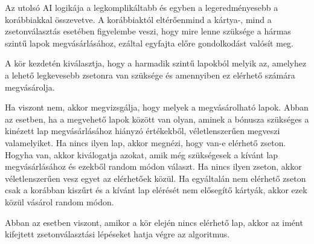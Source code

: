 Az utolsó AI logikája a legkomplikáltabb és egyben a legeredményesebb a korábbiakkal összevetve. A korábbiaktól eltérőenmind a kártya-, mind a zsetonválasztás esetében figyelembe veszi, hogy mire lenne szüksége a hármas szintű lapok megvásárlásához, ezáltal egyfajta előre gondolkodást valósít meg.\par
A kör kezdetén kiválasztja, hogy a harmadik szintű lapokból melyik az, amelyhez a lehető legkevesebb zsetonra van szüksége és amennyiben ez elérhető számára megvásárolja.\par
Ha viszont nem, akkor megvizsgálja, hogy melyek a megvásárolható lapok. Abban az esetben, ha a megvehető lapok között van olyan, aminek a bónusza szükséges a kinézett lap megvásárlásához hiányzó értékekből, véletlenszerűen megveszi valamelyiket. Ha nincs ilyen lap, akkor megnézi, hogy van-e elérhető zseton. Hogyha van, akkor kiválogatja azokat, amik még szükségesek a kívánt lap megvásárlásához és ezekből random módon választ. Ha nincs ilyen zseton, akkor véletlenszerűen vesz egyet az elérhetőek közül. Ha egyáltalán nem elérhető zseton csak a korábban kiszűrt és a kívánt lap elérését nem elősegítő kártyák, akkor ezek közül vásárol random módon.\par
Abban az esetben viszont, amikor a kör elején nincs elérhető lap, akkor az imént kifejtett zsetonválasztási lépéseket hatja végre az algoritmus.